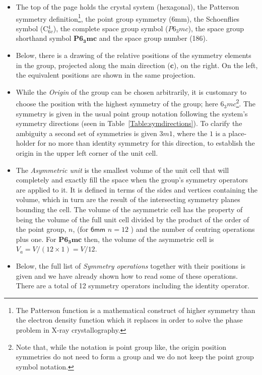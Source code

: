 \begin{itemize}  
 \item The top of the page holds the crystal system (hexagonal), the Patterson symmetry definition\footnote{ The Patterson function is a mathematical construct of higher symmetry than the electron density function which it replaces in order to  solve the phase problem in X-ray crystallography. }, the point group symmetry (6mm), the Schoenflies symbol (\textsf{C$^4_{6v}$}), the complete space group symbol ($P6_3mc$), the space group shorthand symbol $\mathbf{P6_3mc}$ and the space group number (186).
 
 \item Below, there is a drawing of the relative positions of the symmetry elements in the group, projected along the main direction ($\mathbf{c}$), on the right. On the left, the equivalent positions are shown in the same projection.
 
 \item While the \textit{Origin} of the group can be chosen arbitrarily, it is customary to choose the position with the highest symmetry of the group; here $6_3mc$\footnote{ Note that, while the notation is point group like, the origin position symmetries do not need to form a group and we do not keep the point group symbol notation.}. The symmetry is given in the usual point group notation following the system's symmetry directions (seen in Table~\ref{Table:symdirections}). To clarify the ambiguity a second set of symmetries is given $3m1$, where the $1$ is a place-holder for no more than identity symmetry for this direction, to establish the origin in the upper left corner of the unit cell.
 
 \item The \textit{Asymmetric unit} is the smallest volume of the unit cell that will completely and exactly fill the space when the group's symmetry operators are applied to it. It is defined in terms of the sides and vertices containing the volume, which in turn are the result of the intersecting symmetry planes bounding the cell. The volume of the asymmetric cell has the property of being the volume of the full unit cell divided by the product of the order of the point group, $n$, (for $\mathsf{6mm}$ $n=12$ ) and the number of centring operations plus one. For $\mathbf{P6_3mc}$ then, the volume of the asymmetric cell is $V_a = V/(12 \times 1)=V/12$.
 
 \item Below, the full list of \textit{Symmetry operations} together with their positions is given and we have already shown how to read some of these operations. There are a total of 12 symmetry operators including the identity  operator.
 

\end{itemize}
